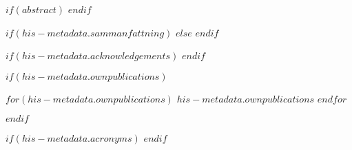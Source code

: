 \begin{frontmatter}
  $if(abstract)$
  $endif$
  
  $if(his-metadata.sammanfattning)$
  $else$
  $endif$
  
  $if(his-metadata.acknowledgements)$
  $endif$
  
  $if(his-metadata.ownpublications)$
  \begin{ownpublications}
	$for(his-metadata.ownpublications)$
	$his-metadata.ownpublications$
	$endfor$

  \end{ownpublications}
  $endif$
\end{frontmatter}

$if(his-metadata.acronyms)$
$endif$


